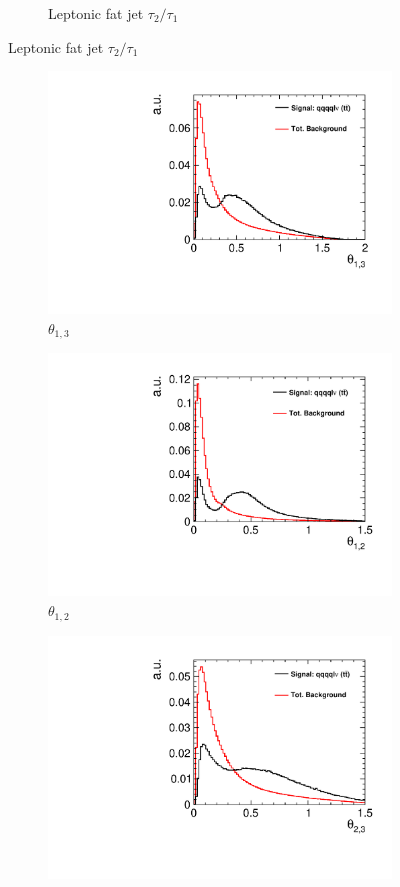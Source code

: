 \begin{figure}[]
\begin{subfigure}[b]{0.5\linewidth}
    \caption{Leptonic fat jet $\tau_2/\tau_1$} 
    \vspace{4ex}
  \end{subfigure}
\end{figure}

\begin{figure}[]\ContinuedFloat 
  \begin{subfigure}[b]{0.5\linewidth}
    \centering
    \includegraphics[width=0.75\linewidth]{TopAnalysis/figures/BDTVariables/HighEtoLowEDira.pdf} 
    \caption{$\theta_{1,3}$} 
    \vspace{4ex}
  \end{subfigure}%
  \begin{subfigure}[b]{0.5\linewidth}
    \centering
    \includegraphics[width=0.75\linewidth]{TopAnalysis/figures/BDTVariables/HighEtoMidEDira.pdf} 
    \caption{$\theta_{1,2}$} 
    \vspace{4ex}
  \end{subfigure} 
  \begin{subfigure}[b]{0.5\linewidth}
    \centering
    \includegraphics[width=0.75\linewidth]{TopAnalysis/figures/BDTVariables/MidEtoLowEDira.pdf} 

\end{subfigure}
\end{figure}
